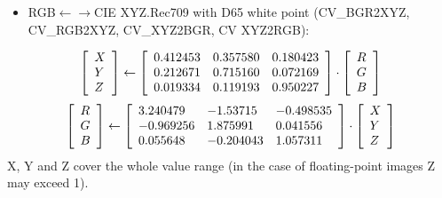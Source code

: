 \documentclass{article}
\begin{document}
\begin{itemize}
\item RGB$\leftarrow \to $CIE XYZ.Rec709 with D65 white point (CV{\_}BGR2XYZ, CV{\_}RGB2XYZ, CV{\_}XYZ2BGR, CV XYZ2RGB):
\end{itemize}
\[
\left[ {{\begin{array}{*{20}c}
 X \hfill \\
 Y \hfill \\
 Z \hfill \\
\end{array} }} \right]\leftarrow \left[ {{\begin{array}{*{20}c}
 {0.412453} \hfill & {0.357580} \hfill & {0.180423} \hfill \\
 {0.212671} \hfill & {0.715160} \hfill & {0.072169} \hfill \\
 {0.019334} \hfill & {0.119193} \hfill & {0.950227} \hfill \\
\end{array} }} \right]\cdot \left[ {{\begin{array}{*{20}c}
 R \hfill \\
 G \hfill \\
 B \hfill \\
\end{array} }} \right]
\]
\[
\left[ {{\begin{array}{*{20}c}
 R \hfill \\
 G \hfill \\
 B \hfill \\
\end{array} }} \right]\leftarrow \left[ {{\begin{array}{*{20}c}
 {3.240479} \hfill & {-1.53715} \hfill & {-0.498535} \hfill \\
 {-0.969256} \hfill & {1.875991} \hfill & {0.041556} \hfill \\
 {0.055648} \hfill & {-0.204043} \hfill & {1.057311} \hfill \\
\end{array} }} \right]\cdot \left[ {{\begin{array}{*{20}c}
 X \hfill \\
 Y \hfill \\
 Z \hfill \\
\end{array} }} \right]
\]
X, Y and Z cover the whole value range (in the case of floating-point images
Z may exceed 1).
\end{document}
